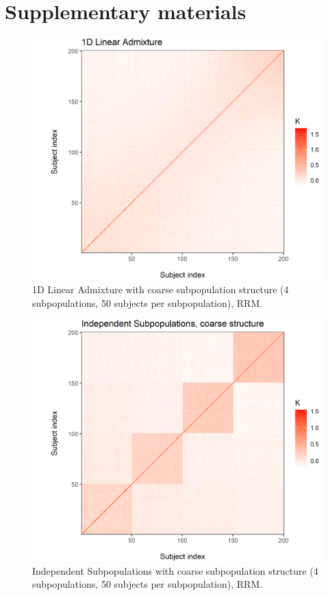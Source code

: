 \section*{Supplementary materials}

\begin{figure}[H]
    \centering
    \includegraphics[scale = 1]{figures/admixed_kinship.png}
    \caption{1D Linear Admixture with coarse subpopulation structure (4 subpopulations, 50 subjects per subpopulation), RRM.}
    \label{fig:admixed}
\end{figure}

\begin{figure}[H]
    \centering
    \includegraphics[scale = 1]{figures/indep_coarse_kinship.png}
    \caption{Independent Subpopulations with coarse subpopulation structure (4 subpopulations, 50 subjects per subpopulation), RRM.}
    \label{fig:indep_coarse}
\end{figure}

